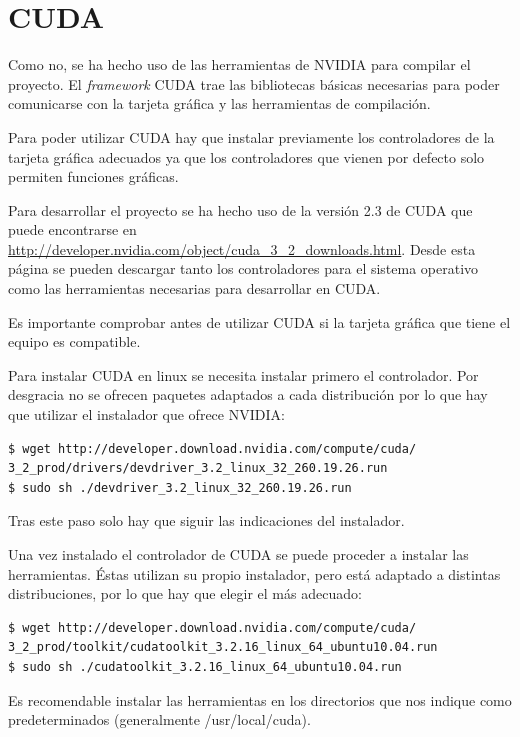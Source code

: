 \section{CUDA}

Como no, se ha hecho uso de las herramientas de NVIDIA para compilar el proyecto. El \emph{framework} CUDA trae las bibliotecas básicas necesarias para poder comunicarse con la tarjeta gráfica y las herramientas de compilación.

Para poder utilizar CUDA hay que instalar previamente los controladores de la tarjeta gráfica adecuados ya que los controladores que vienen por defecto solo permiten funciones gráficas.

Para desarrollar el proyecto se ha hecho uso de la versión 2.3 de CUDA que puede encontrarse en \url{http://developer.nvidia.com/object/cuda_3_2_downloads.html}. Desde esta página se pueden descargar tanto los controladores para el sistema operativo como las herramientas necesarias para desarrollar en CUDA.

Es importante comprobar antes de utilizar CUDA si la tarjeta gráfica que tiene el equipo es compatible.

Para instalar CUDA en linux se necesita instalar primero el controlador. Por desgracia no se ofrecen paquetes adaptados a cada distribución por lo que hay que utilizar el instalador que ofrece NVIDIA:

\begin{verbatim}
$ wget http://developer.download.nvidia.com/compute/cuda/
3_2_prod/drivers/devdriver_3.2_linux_32_260.19.26.run
$ sudo sh ./devdriver_3.2_linux_32_260.19.26.run
\end{verbatim}

Tras este paso solo hay que siguir las indicaciones del instalador.

Una vez instalado el controlador de CUDA se puede proceder a instalar las herramientas. Éstas utilizan su propio instalador, pero está adaptado a distintas distribuciones, por lo que hay que elegir el más adecuado:

\begin{verbatim}
$ wget http://developer.download.nvidia.com/compute/cuda/
3_2_prod/toolkit/cudatoolkit_3.2.16_linux_64_ubuntu10.04.run
$ sudo sh ./cudatoolkit_3.2.16_linux_64_ubuntu10.04.run
\end{verbatim}

Es recomendable instalar las herramientas en los directorios que nos indique como predeterminados (generalmente /usr/local/cuda).

